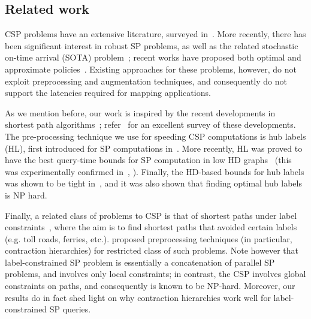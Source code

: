 \subsection{Related work}

CSP problems have an extensive literature, surveyed in~\cite{csp_survey}. 
More recently, there has been significant interest in robust SP problems, as well as the related stochastic on-time arrival (SOTA) problem~\cite{fan2005arriving}; recent works have proposed both optimal and approximate policies~\cite{sabran2014precomputation,nikolova_discretization}. 
Existing approaches for these problems, however, do not exploit preprocessing and augmentation techniques, and consequently do not support the latencies required for mapping applications.

As we mention before, our work is inspired by the recent developments in shortest path algorithms~\cite{highway2013,hubimplem,highway2010,dimacs09,geisberger_ch_definition,skeleton}; refer~\cite{goldberg_survey} for an excellent survey of these developments. 
The pre-processing technique we use for speeding CSP computations is hub labels (HL), first introduced for SP computations in~\cite{cohen_definition_hl}. 
More recently, HL was proved to have the best query-time bounds for SP computation in low HD graphs~\cite{highway2013,highway2010} (this was experimentally confirmed in~\cite{hubimplem}, \cite[Figure 7]{goldberg_survey}).  
Finally, the HD-based bounds for hub labels was shown to be tight in~\cite{babenko_hl_complexity,white_complexity_hd}, and it was also shown that finding optimal hub labels is NP hard.

Finally, a related class of problems to CSP is that of shortest paths under label constraints~\cite{language_csp}, where the aim is to find shortest paths that avoided certain labels (e.g. toll roads, ferries, etc.). \cite{rice_csp} proposed preprocessing techniques (in particular, contraction hierarchies) for restricted class of such problems. 
Note however that label-constrained SP problem is essentially a concatenation of parallel SP problems, and involves only local constraints; in contrast, the CSP involves global constraints on paths, and consequently is known to be NP-hard. 
Moreover, our results do in fact shed light on why contraction hierarchies work well for label-constrained SP queries.